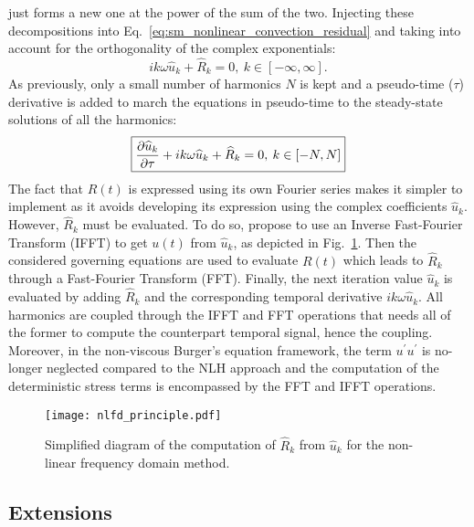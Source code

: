 just forms a new one at the power of the sum of the
two.
Injecting these decompositions into 
Eq.~\eqref{eq:sm_nonlinear_convection_residual} and taking into account
for the orthogonality of the complex exponentials:
\begin{equation}
	i k \omega \widehat{u}_k + \widehat{R}_k = 0, \: k \in [-\infty, \infty].
\end{equation}
As previously, only a small number of harmonics $N$ is kept and 
a pseudo-time ($\tau$) derivative is added to march the equations
in pseudo-time to the steady-state solutions of all the harmonics:
\begin{equation}
	\fbox{$
	\displaystyle \frac{\partial \widehat{u}_k}{\partial \tau} + 
	i k \omega \widehat{u}_k + \widehat{R}_k = 0, \: k \in [-N, N]
	$}
	\label{eq:sm_nlfd_subset_eq}
\end{equation}
The fact that $R(t)$ is expressed using its own Fourier series 
makes it simpler to implement 
as it avoids developing its expression using 
the complex coefficients $\widehat{u}_k$. 
However, $\widehat{R}_k$ must be evaluated. To do so, \citet{McMullen2001}
propose to use an Inverse Fast-Fourier Transform (IFFT) to get
$u(t)$ from $\widehat{u}_k$, as depicted
in Fig.~\ref{fig:nlfd_principle}. Then the considered governing equations
are used to evaluate $R(t)$ which leads to $\widehat{R}_k$
through a Fast-Fourier Transform (FFT). Finally, the next iteration value 
$\widehat{u}_k$
is evaluated by adding $\widehat{R}_k$ and 
the corresponding temporal derivative $i k \omega \widehat{u}_k$. All
harmonics are coupled through the IFFT and FFT operations
that needs all of the former to compute the counterpart temporal signal,
hence the coupling. Moreover, 
in the non-viscous Burger's equation framework, 
the term $u^\prime u^\prime$ is no-longer neglected compared to the
NLH approach and the computation of the deterministic stress terms is encompassed
by the FFT and IFFT operations.
\begin{figure}[htp]
  \centering
  \texttt{[image: nlfd\_principle.pdf]}
  \caption{Simplified diagram of the computation of $\widehat{R}_k$ from $\widehat{u}_k$
  for the non-linear frequency domain method.}
  \label{fig:nlfd_principle}
\end{figure}

\subsection{Extensions}

